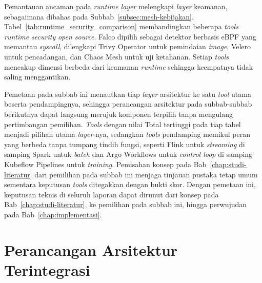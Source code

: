 

Pemantauan ancaman pada \textit{runtime layer} melengkapi \textit{layer} keamanan, sebagaimana dibahas pada Subbab~\ref{subsec:mesh-kebijakan}. Tabel~\ref{tab:runtime_security_comparison} membandingkan beberapa \textit{tools} \textit{runtime security} \textit{open source}. Falco dipilih sebagai detektor berbasis eBPF yang memantau \textit{syscall}, dilengkapi Trivy Operator untuk pemindaian \textit{image}, Velero untuk pencadangan, dan Chaos Mesh untuk uji ketahanan. Setiap \textit{tools} mencakup dimensi berbeda dari keamanan \textit{runtime} sehingga keempatnya tidak saling menggantikan.



Pemetaan pada subbab ini menautkan tiap \textit{layer} arsitektur ke satu \textit{tool} utama beserta pendampingnya, sehingga perancangan arsitektur pada subbab-subbab berikutnya dapat langsung merujuk komponen terpilih tanpa mengulang pertimbangan pemilihan. \textit{Tools} dengan nilai Total tertinggi pada tiap tabel menjadi pilihan utama \textit{layer}-nya, sedangkan \textit{tools} pendamping memikul peran yang berbeda tanpa tumpang tindih fungsi, seperti Flink untuk \textit{streaming} di samping Spark untuk \textit{batch} dan Argo Workflows untuk \textit{control loop} di samping Kubeflow Pipelines untuk \textit{training}. Pemisahan konsep pada Bab~\ref{chap:studi-literatur} dari pemilihan pada subbab ini menjaga tinjauan pustaka tetap umum sementara keputusan \textit{tools} ditegakkan dengan bukti skor. Dengan pemetaan ini, keputusan teknis di seluruh laporan dapat dirunut dari konsep pada Bab~\ref{chap:studi-literatur}, ke pemilihan pada subbab ini, hingga perwujudan pada Bab~\ref{chap:implementasi}.

\section{Perancangan Arsitektur Terintegrasi}
\label{sec:arsitektur-terintegrasi}

